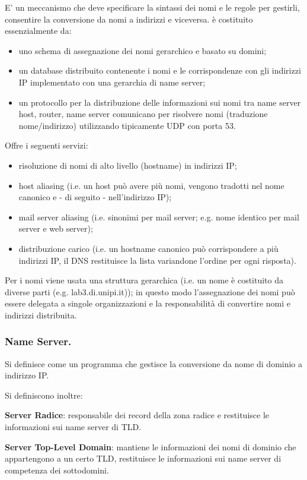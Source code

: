 \documentclass[11pt, italian, openany]{book}
\begin{document}
\begin{sloppypar}
E' un meccanismo che deve specificare la sintassi dei nomi e le regole per gestirli, consentire la conversione da nomi a indirizzi e viceversa.
è costituito essenzialmente da:
\begin{itemize}[topsep=0pt]
	\itemsep-0.3em
	\item uno schema di assegnazione dei nomi gerarchico e basato su domini;
	\item un database distribuito contenente i nomi e le corrispondenze con gli indirizzi IP implementato con una gerarchia di name server;
	\item un protocollo per la distribuzione delle informazioni sui nomi tra name server host, router, name server comunicano per risolvere nomi (traduzione nome/indirizzo) utilizzando tipicamente UDP con porta 53.
\end{itemize}

Offre i seguenti servizi:
\begin{itemize}[topsep=0pt]
	\itemsep-0.3em
	\item risoluzione di nomi di alto livello (hostname) in indirizzi IP;
	\item host aliasing (i.e. un host può avere più nomi, vengono tradotti nel nome canonico e - di seguito - nell'indirizzo IP);
	\item mail server aliasing (i.e. sinonimi per mail server; e.g. nome identico per mail server e web server);
	\item distribuzione carico (i.e. un hostname canonico può corrispondere a più indirizzi IP, il DNS restituisce la lista variandone l'ordine per ogni risposta).
\end{itemize}

Per i nomi viene usata una struttura gerarchica (i.e. un nome è costituito da diverse parti (e.g. lab3.di.unipi.it)); in questo modo
l'assegnazione dei nomi può essere delegata a singole organizzazioni e la responsabilità di convertire nomi e indirizzi distribuita.

\subsubsection*{Name Server.}
Si definisce come un programma che gestisce la conversione da nome di dominio a indirizzo IP.

Si definiscono inoltre:

\textbf{Server Radice}: responsabile dei record della zona radice e restituisce le informazioni sui name server di TLD.

\textbf{Server Top-Level Domain}: mantiene le informazioni dei nomi di dominio che appartengono a un certo TLD, restituisce le informazioni
sui name server di competenza dei sottodomini.


\end{sloppypar}
\end{document}
